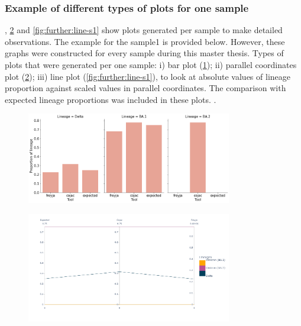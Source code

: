         \subsubsection{Example of different types of plots for one sample} 
        , \cref{fig:further:pc-s1} and \cref{fig:further:line-s1} show plots generated per sample to make detailed observations. The example for the sample1 is provided below. However, these graphs were constructed for every sample during this master thesis. Types of plots that were generated per one sample: i) bar plot (\cref{fig:further:bar-s1}); ii) parallel coordinates plot (\cref{fig:further:pc-s1}); iii) line plot (\cref{fig:further:line-s1}), to look at absolute values of lineage proportion against scaled values in parallel coordinates. The comparison with expected lineage proportions was included in these plots.
.
        \begin{figure}[H]
        	\centering
            \includegraphics[width=0.8\textwidth]{figures/further/bar-s1.png}
            \label{fig:further:bar-s1}
        \end{figure}
        \begin{figure}[H]
        	\centering
            \includegraphics[width=0.8\textwidth]{figures/further/pc-s1.png}
            \label{fig:further:pc-s1}
        \end{figure}
